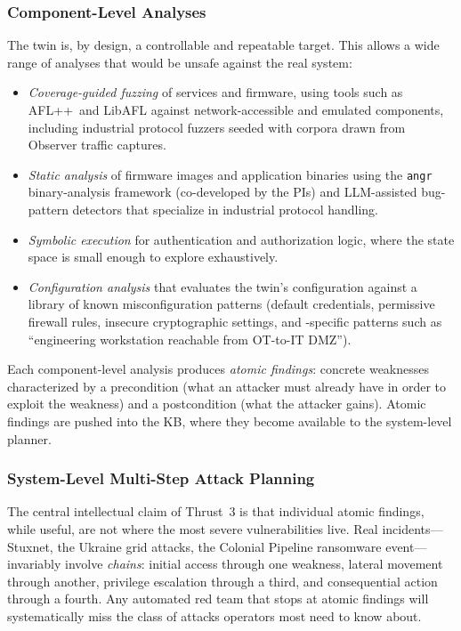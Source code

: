 \subsubsection{Component-Level Analyses}

The twin is, by design, a controllable and repeatable target. This
allows a wide range of analyses that would be unsafe against the real
system:

\begin{itemize}[leftmargin=1.3em,itemsep=0.1em,topsep=0.2em]
  \item \emph{Coverage-guided fuzzing} of services and firmware, using
  tools such as AFL++\ and LibAFL against network-accessible and
  emulated components, including industrial protocol fuzzers seeded
  with corpora drawn from Observer traffic captures.
  \item \emph{Static analysis} of firmware images and application
  binaries using the \texttt{angr} binary-analysis framework
  (co-developed by the PIs) and LLM-assisted bug-pattern detectors
  that specialize in industrial protocol handling.
  \item \emph{Symbolic execution} for authentication and authorization
  logic, where the state space is small enough to explore exhaustively.
  \item \emph{Configuration analysis} that evaluates the twin's
  configuration against a library of known misconfiguration patterns
  (default credentials, permissive firewall rules, insecure
  cryptographic settings, and \cps-specific patterns such as
  ``engineering workstation reachable from OT-to-IT DMZ'').
\end{itemize}

Each component-level analysis produces \emph{atomic findings}: concrete
weaknesses characterized by a precondition (what an attacker must
already have in order to exploit the weakness) and a postcondition
(what the attacker gains). Atomic findings are pushed into the KB,
where they become available to the system-level planner.

\subsubsection{System-Level Multi-Step Attack Planning}

The central intellectual claim of Thrust~3 is that individual atomic
findings, while useful, are not where the most severe \cps
vulnerabilities live. Real incidents---Stuxnet, the Ukraine grid
attacks, the Colonial Pipeline ransomware event---invariably involve
\emph{chains}: initial access through one weakness, lateral movement
through another, privilege escalation through a third, and
consequential action through a fourth. Any automated red team that
stops at atomic findings will systematically miss the class of attacks
operators most need to know about.

